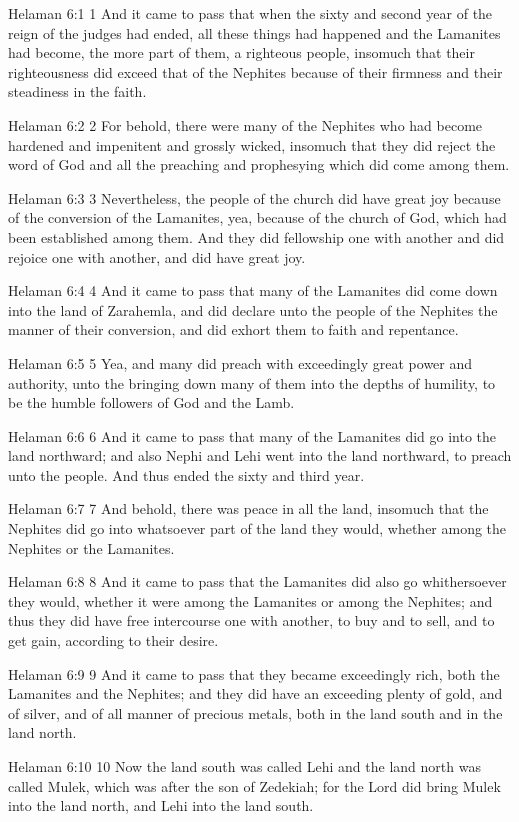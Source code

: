 Helaman 6:1
 1 And it came to pass that when the sixty and second year of the
reign of the judges had ended, all these things had happened and
the Lamanites had become, the more part of them, a righteous
people, insomuch that their righteousness did exceed that of the
Nephites because of their firmness and their steadiness in the
faith.

Helaman 6:2
 2 For behold, there were many of the Nephites who had become
hardened and impenitent and grossly wicked, insomuch that they
did reject the word of God and all the preaching and prophesying
which did come among them.

Helaman 6:3
 3 Nevertheless, the people of the church did have great joy
because of the conversion of the Lamanites, yea, because of the
church of God, which had been established among them. And they
did fellowship one with another and did rejoice one with another,
and did have great joy.

Helaman 6:4
 4 And it came to pass that many of the Lamanites did come down
into the land of Zarahemla, and did declare unto the people of
the Nephites the manner of their conversion, and did exhort them
to faith and repentance.

Helaman 6:5
 5 Yea, and many did preach with exceedingly great power and
authority, unto the bringing down many of them into the depths of
humility, to be the humble followers of God and the Lamb.

Helaman 6:6
 6 And it came to pass that many of the Lamanites did go into the
land northward; and also Nephi and Lehi went into the land
northward, to preach unto the people. And thus ended the sixty
and third year.

Helaman 6:7
 7 And behold, there was peace in all the land, insomuch that the
Nephites did go into whatsoever part of the land they would,
whether among the Nephites or the Lamanites.

Helaman 6:8
 8 And it came to pass that the Lamanites did also go
whithersoever they would, whether it were among the Lamanites or
among the Nephites; and thus they did have free intercourse one
with another, to buy and to sell, and to get gain, according to
their desire.

Helaman 6:9
 9 And it came to pass that they became exceedingly rich, both
the Lamanites and the Nephites; and they did have an exceeding
plenty of gold, and of silver, and of all manner of precious
metals, both in the land south and in the land north.

Helaman 6:10
 10 Now the land south was called Lehi and the land north was
called Mulek, which was after the son of Zedekiah; for the Lord
did bring Mulek into the land north, and Lehi into the land
south.

